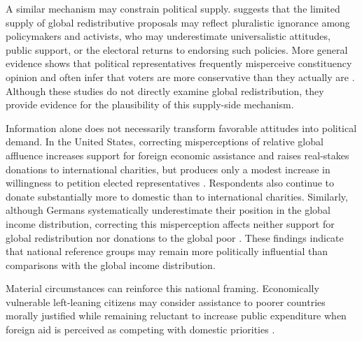 A similar mechanism may constrain political supply. \citet{fabre_public_2026} suggests that the limited supply of global redistributive proposals may reflect pluralistic ignorance among policymakers and activists, who may underestimate universalistic attitudes, public support, or the electoral returns to endorsing such policies. More general evidence shows that political representatives frequently misperceive constituency opinion and often infer that voters are more conservative than they actually are \citep{broockman_bias_2018,pilet_politicians_2023}. Although these studies do not directly examine global redistribution, they provide evidence for the plausibility of this supply-side mechanism.

Information alone does not necessarily transform favorable attitudes into political demand. In the United States, correcting misperceptions of relative global affluence increases support for foreign economic assistance and raises real-stakes donations to international charities, but produces only a modest increase in willingness to petition elected representatives \citep{nair_misperceptions_2018}. Respondents also continue to donate substantially more to domestic than to international charities. Similarly, although Germans systematically underestimate their position in the global income distribution, correcting this misperception affects neither support for global redistribution nor donations to the global poor \citep{fehr_your_2019}. These findings indicate that national reference groups may remain more politically influential than comparisons with the global income distribution.

Material circumstances can reinforce this national framing. Economically vulnerable left-leaning citizens may consider assistance to poorer countries morally justified while remaining reluctant to increase public expenditure when foreign aid is perceived as competing with domestic priorities \citep{cho_ideology_2024}. %

